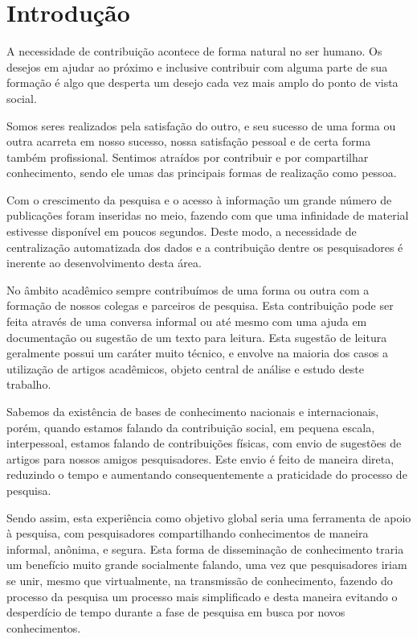 
\chapter{Introdução}
\label{cha:introduction}

A necessidade de contribuição acontece de forma natural no ser humano. Os desejos em ajudar ao próximo e inclusive contribuir com alguma parte de sua formação é algo que desperta um desejo cada vez mais amplo do ponto de vista social.

Somos seres realizados pela satisfação do outro, e seu sucesso de uma forma ou outra acarreta em nosso sucesso, nossa satisfação pessoal e de certa forma também profissional. Sentimos atraídos por contribuir e por compartilhar conhecimento, sendo ele umas das principais formas de realização como pessoa.

Com o crescimento da pesquisa e o acesso à informação um grande número de publicações foram inseridas no meio, fazendo com que uma infinidade de material estivesse disponível em poucos segundos. Deste modo, a necessidade de centralização automatizada dos dados e a contribuição dentre os pesquisadores é inerente ao desenvolvimento desta área. 

No âmbito acadêmico sempre contribuímos de uma forma ou outra com a formação de nossos colegas e parceiros de pesquisa. Esta contribuição pode ser feita através de uma conversa informal ou até mesmo com uma ajuda em documentação ou sugestão de um texto para leitura. Esta sugestão de leitura geralmente possui um caráter muito técnico, e envolve na maioria dos casos a utilização de artigos acadêmicos, objeto central de análise e estudo deste trabalho.

Sabemos da existência de bases de conhecimento nacionais e internacionais, porém, quando estamos falando da contribuição social, em pequena escala, interpessoal, estamos falando de contribuições físicas, com envio de sugestões de artigos para nossos amigos pesquisadores. Este envio é feito de maneira direta, reduzindo o tempo e aumentando consequentemente a praticidade do processo de pesquisa.

Sendo assim, esta experiência como objetivo global seria uma ferramenta de apoio à pesquisa, com pesquisadores compartilhando conhecimentos de maneira informal, anônima, e segura. Esta forma de disseminação de conhecimento traria um benefício muito grande socialmente falando, uma vez que pesquisadores iriam se unir, mesmo que virtualmente, na transmissão de conhecimento, fazendo do processo da pesquisa um processo mais simplificado e desta maneira evitando o desperdício de tempo durante a fase de pesquisa em busca por novos conhecimentos.


